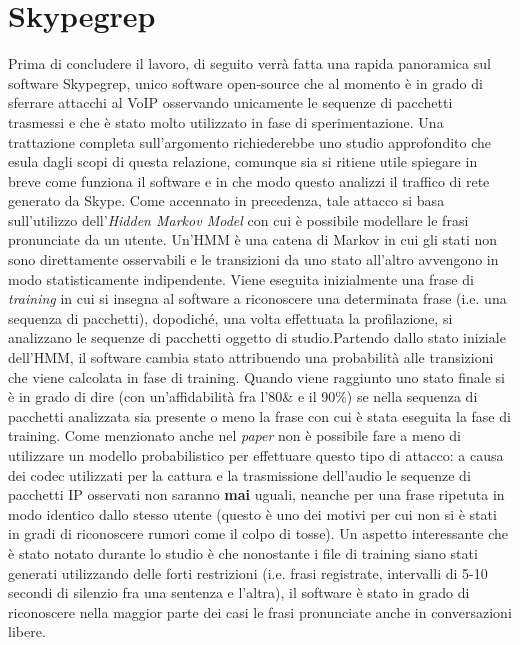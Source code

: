 \section{Skypegrep}

Prima di concludere il lavoro, di seguito verrà fatta una rapida panoramica sul software Skypegrep, unico software open-source che al momento è in grado di sferrare attacchi al VoIP osservando unicamente le sequenze di pacchetti trasmessi e che è stato molto utilizzato in fase di sperimentazione.\newline
Una trattazione completa sull'argomento richiederebbe uno studio approfondito che esula dagli scopi di questa relazione, comunque sia si ritiene utile spiegare in breve come funziona il software e in che modo questo analizzi il traffico di rete generato da Skype.\newline\newline
Come accennato in precedenza, tale attacco si basa sull'utilizzo dell'\emph{Hidden Markov Model} con cui è possibile modellare le frasi pronunciate da un utente. Un'HMM è una catena di Markov in cui gli stati non sono direttamente osservabili e le transizioni da uno stato all'altro avvengono in modo statisticamente indipendente.\newline
Viene eseguita inizialmente una frase di \emph{training} in cui si insegna al software a riconoscere una determinata frase (i.e. una sequenza di pacchetti), dopodiché, una volta effettuata la profilazione, si analizzano le sequenze di pacchetti oggetto di studio.\newline Partendo dallo stato iniziale dell'HMM, il software cambia stato attribuendo una probabilità alle transizioni che viene calcolata in fase di training. Quando viene raggiunto uno stato finale si è in grado di dire (con un'affidabilità fra l'80\& e il 90\%) se nella sequenza di pacchetti analizzata sia presente o meno la frase con cui è stata eseguita la fase di training.\newline
Come menzionato anche nel \textsl{paper} \cite{bibitem1} non è possibile fare a meno di utilizzare un modello probabilistico per effettuare questo tipo di attacco: a causa dei codec utilizzati per la cattura e la trasmissione dell'audio le sequenze di pacchetti IP osservati non saranno \textbf{mai} uguali, neanche per una frase ripetuta in modo identico dallo stesso utente (questo è uno dei motivi per cui non si è stati in gradi di riconoscere rumori come il colpo di tosse).\newline
Un aspetto interessante che è stato notato durante lo studio è che nonostante i file di training siano stati generati utilizzando delle forti restrizioni (i.e. frasi registrate, intervalli di 5-10 secondi di silenzio fra una sentenza e l'altra), il software è stato in grado di riconoscere nella maggior parte dei casi le frasi pronunciate anche in conversazioni libere.

